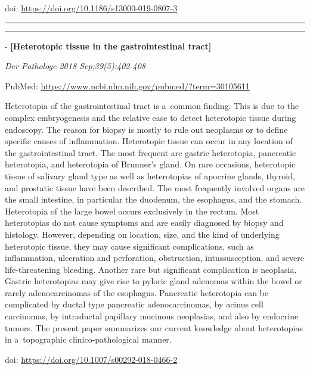 \documentclass[]{article}
\begin{document}
doi: \url{https://doi.org/10.1186/s13000-019-0807-3}

{}

{}

\begin{center}\rule{0.5\linewidth}{\linethickness}\end{center}

\begin{center}\rule{0.5\linewidth}{\linethickness}\end{center}

 - \textbf{{[}Heterotopic tissue in the gastrointestinal tract{]}}

\emph{Der Pathologe 2018 Sep;39(5):402-408}

PubMed: \url{https://www.ncbi.nlm.nih.gov/pubmed/?term=30105611}

Heterotopia of the gastrointestinal tract is a~common finding. This is
due to the complex embryogenesis and the relative ease to detect
heterotopic tissue during endoscopy. The reason for biopsy is mostly to
rule out neoplasms or to define specific causes of inflammation.
Heterotopic tissue can occur in any location of the gastrointestinal
tract. The most frequent are gastric heterotopia, pancreatic
heterotopia, and heterotopia of Brunner's gland. On rare occasions,
heterotopic tissue of salivary gland type as well as heterotopias of
apocrine glands, thyroid, and prostatic tissue have been described. The
most frequently involved organs are the small intestine, in particular
the duodenum, the esophagus, and the stomach. Heterotopia of the large
bowel occurs exclusively in the rectum. Most heterotopias do not cause
symptoms and are easily diagnosed by biopsy and histology. However,
depending on location, size, and the kind of underlying heterotopic
tissue, they may cause significant complications, such as inflammation,
ulceration and perforation, obstruction, intussusception, and severe
life-threatening bleeding. Another rare but significant complication is
neoplasia. Gastric heterotopias may give rise to pyloric gland adenomas
within the bowel or rarely adenocarcinomas of the esophagus. Pancreatic
heterotopia can be complicated by ductal type pancreatic
adenocarcinomas, by acinus cell carcinomas, by intraductal papillary
mucinous neoplasias, and also by endocrine tumors. The present paper
summarizes our current knowledge about heterotopias in a~topographic
clinico-pathological manner.

doi: \url{https://doi.org/10.1007/s00292-018-0466-2}

{}
\end{document}
